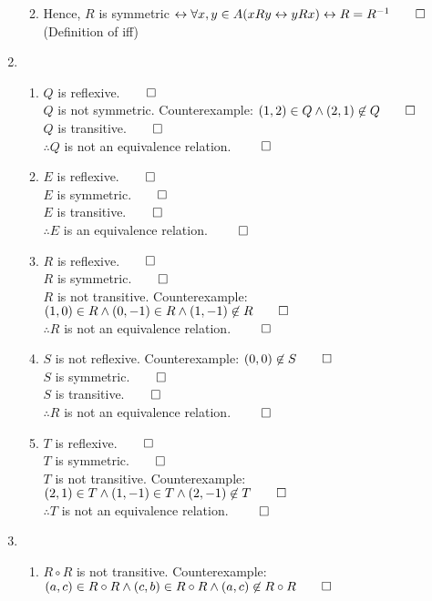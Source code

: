 \documentclass[12pt, a4paper]{article}
\begin{document}
\begin{enumerate}[Q\arabic*.]
\begin{enumerate}[label=\arabic*., parsep=1em]
\begin{enumerate}[label=3.\arabic*., parsep=1em]
        \end{enumerate}
      \item Hence, $R$ is symmetric $\iff \forall x, y \in A(x R y \iff y R x) \iff R = R^{-1} \qed$\hfill(Definition of iff)
    \end{enumerate}
  \pagebreak
  \item 
    \begin{enumerate}[(\alph*)]
      \item $Q$ is reflexive.$\qed$\\
        $Q$ is not symmetric. Counterexample: $(1, 2) \in Q \land (2, 1) \not\in Q \qed$\\
        $Q$ is transitive.$\qed$\\
        $\therefore Q$ is not an equivalence relation. $\qed$
      \item $E$ is reflexive.$\qed$\\
        $E$ is symmetric.$\qed$\\
        $E$ is transitive.$\qed$\\
        $\therefore E$ is an equivalence relation. $\qed$
      \item $R$ is reflexive.$\qed$\\
        $R$ is symmetric.$\qed$\\
        $R$ is not transitive. Counterexample: $(1, 0) \in R \land (0, -1) \in R \land (1, -1) \not\in R\qed$\\
        $\therefore R$ is not an equivalence relation. $\qed$
      \item $S$ is not reflexive. Counterexample: $(0, 0) \not\in S\qed$\\
        $S$ is symmetric.$\qed$\\
        $S$ is transitive.$\qed$\\
        $\therefore R$ is not an equivalence relation. $\qed$
      \item $T$ is reflexive.$\qed$\\
        $T$ is symmetric.$\qed$\\
        $T$ is not transitive. Counterexample: $(2, 1) \in T \land (1, -1) \in T \land (2, -1) \not\in T\qed$\\
        $\therefore T$ is not an equivalence relation. $\qed$
    \end{enumerate}
  \pagebreak
  \item 
    \begin{enumerate}[(\alph*)]
      \item $R \circ R$ is not transitive. Counterexample: $(a, c) \in R\circ R \land (c, b) \in R\circ R \land (a, c) \not\in R\circ R \qed$
        \begin{center}
        \end{center}


\end{enumerate}
\end{enumerate}
\end{document}
